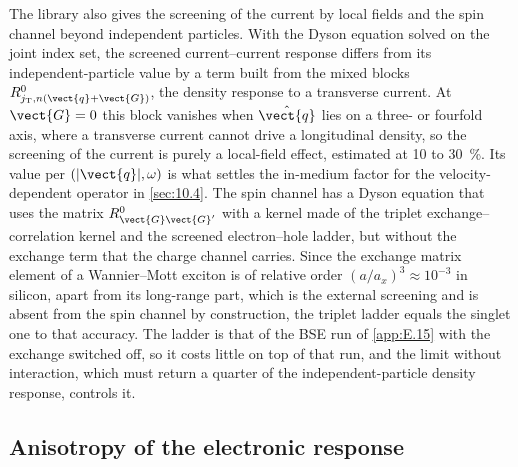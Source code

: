 The library also gives the screening of the current by local fields and the spin channel beyond independent particles. With the Dyson equation solved on the joint index set, the screened current--current response differs from its independent-particle value by a term built from the mixed blocks $R^0_{j_{\mathrm{T}},n(\vect{q}+\vect{G})}$, the density response to a transverse current. At $\vect{G} = 0$ this block vanishes when $\hat{\vect{q}}$ lies on a three- or fourfold axis, where a transverse current cannot drive a longitudinal density, so the screening of the current is purely a local-field effect, estimated at 10 to \SI{30}{\percent}. Its value per $(|\vect{q}|,\omega)$ is what settles the in-medium factor for the velocity-dependent operator in \cref{sec:10.4}. The spin channel has a Dyson equation that uses the matrix $R^0_{\vect{G}\vect{G}'}$ with a kernel made of the triplet exchange--correlation kernel and the screened electron--hole ladder, but without the exchange term that the charge channel carries. Since the exchange matrix element of a Wannier--Mott exciton is of relative order $(a/a_x)^3 \approx 10^{-3}$ in silicon, apart from its long-range part, which is the external screening and is absent from the spin channel by construction, the triplet ladder equals the singlet one to that accuracy. The ladder is that of the BSE run of \cref{app:E.15} with the exchange switched off, so it costs little on top of that run, and the limit without interaction, which must return a quarter of the independent-particle density response, controls it.

\subsection{Anisotropy of the electronic response}

